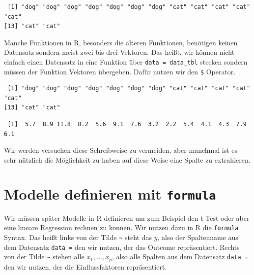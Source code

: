 \documentclass[
  letterpaper,
  DIV=11,
  oneside]{scrreport}
\newenvironment{Shaded}{\begin{snugshade}}{\end{snugshade}}
\newcommand{\NormalTok}[1]{\textcolor[rgb]{0.00,0.23,0.31}{#1}}
\newcommand{\SpecialCharTok}[1]{\textcolor[rgb]{0.37,0.37,0.37}{#1}}
\begin{document}
\begin{verbatim}
 [1] "dog" "dog" "dog" "dog" "dog" "dog" "dog" "cat" "cat" "cat" "cat" "cat"
[13] "cat" "cat"
\end{verbatim}

Manche Funktionen in R, besonders die älteren Funktionen, benötigen
keinen Datensatz sondern meist zwei bis drei Vektoren. Das heißt, wir
können nicht einfach einen Datensatz in eine Funktion über
\texttt{data\ =\ data\_tbl} stecken sondern müssen der Funktion Vektoren
übergeben. Dafür nutzen wir den \texttt{\$} Operator.

\begin{Shaded}
\end{Shaded}

\begin{verbatim}
 [1] "dog" "dog" "dog" "dog" "dog" "dog" "dog" "cat" "cat" "cat" "cat" "cat"
[13] "cat" "cat"
\end{verbatim}

\begin{Shaded}
\end{Shaded}

\begin{verbatim}
 [1]  5.7  8.9 11.8  8.2  5.6  9.1  7.6  3.2  2.2  5.4  4.1  4.3  7.9  6.1
\end{verbatim}

Wir werden versuchen diese Schreibweise zu vermeiden, aber manchmal ist
es sehr nützlich die Möglichkeit zu haben auf diese Weise eine Spalte zu
extrahieren.

\hypertarget{sec-formula}{%
\section{\texorpdfstring{Modelle definieren mit
\texttt{formula}}{Modelle definieren mit formula}}\label{sec-formula}}

Wir müssen später Modelle in R definieren um zum Beispiel den t Test
oder aber eine lineare Regression rechnen zu können. Wir nutzen dazu in
R die \texttt{formula} Syntax. Das heißt links von der Tilde
\texttt{\textasciitilde{}} steht das \(y\), also der Spaltenname aus dem
Datensatz \texttt{data\ =} den wir nutzen, der das Outcome
repräsentiert. Rechts von der Tilde \texttt{\textasciitilde{}} stehen
alle \(x_1, ..., x_p\), also alle Spalten aus dem Datensatz
\texttt{data\ =} den wir nutzen, der die Einflussfaktoren repräsentiert.
\end{document}
